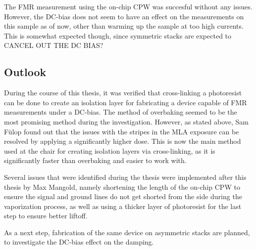 The FMR measurement using the on-chip CPW was succesful without any issues. However, the DC-bias does not seem to have an effect on the measurements on this sample as of now, other than warming up the sample at too high currents. This is somewhat expected though, since symmetric stacks are expected to CANCEL OUT THE DC BIAS?


\subsection{Outlook}
During the course of this thesis, it was verified that cross-linking a photoresist can be done to create an isolation layer for fabricating a device capable of FMR measurements under a DC-bias. The method of overbaking seemed to be the most promising method during the investigation. However, as stated above, Sam Fülop found out that the issues with the stripes in the MLA exposure can be resolved by applying a significantly higher dose. This is now the main method used at the chair for creating isolation layers via cross-linking, as it is significantly faster than overbaking and easier to work with. 

Several issues that were identified during the thesis were implemented after this thesis by Max Mangold, namely shortening the length of the on-chip CPW to ensure the signal and ground lines do not get shorted from the side during the vaporization process, as well as using a thicker layer of photoresist for the last step to ensure better liftoff.

As a next step, fabrication of the same device on asymmetric stacks are planned, to investigate the DC-bias effect on the damping.



